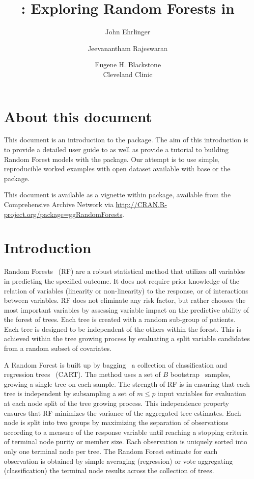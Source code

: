 \documentclass[nojss,letterpaper]{jss}\usepackage[]{graphicx}\usepackage[]{color}
\author{John Ehrlinger \and Jeevanantham Rajeswaran
\and Eugene H. Blackstone\\Cleveland Clinic}
\title{{\pkg{ggRandomForests}}: Exploring Random Forests in \proglang{R}}
\begin{document}



\section{About this document}
This document is an introduction to the   package. The aim of this introduction is to provide a detailed user guide to  as well as provide a tutorial to building Random Forest models with the  package. Our attempt is to use simple, reproducible worked examples with open dataset available with base  or the  package.

This document is available as a vignette within  package, available from the Comprehensive  Archive Network via \url{http://CRAN.R-project.org/package=ggRandomForests}.

\section{Introduction} \label{S:introduction}

Random Forests~\citep{Breiman:2001} (RF) are a robust statistical method that utilizes all variables in predicting the specified outcome. It does not require prior knowledge of the relation of variables (linearity or non-linearity) to the response, or of interactions between variables. RF does not eliminate any risk factor, but rather chooses the most important variables by assessing variable impact on the predictive ability of the forest of trees. Each tree is created with a random sub-group of patients. Each tree is designed to be independent of the others within the forest. This is achieved within the tree growing process by evaluating a split variable candidates from a random subset of covariates.

A Random Forest is built up by bagging~\citep{Breiman:1996} a collection of classification and regression trees~\citep{cart:1984} (CART). The method uses a set of $B$ bootstrap~\citep{bootstrap:1994} samples, growing a single tree on each sample. The strength of RF is in ensuring that each tree is independent by subsampling a set of $m \le p$ input variables for evaluation at each node split of the tree growing process. This independence property ensures that RF minimizes the variance of the aggregated tree estimates. Each node is split into two groups by maximizing the separation of observations according to a measure of the response variable until reaching a stopping criteria of terminal node purity or member size. Each observation is uniquely sorted into only one terminal node per tree. The Random Forest estimate for each observation is obtained by simple averaging (regression) or vote aggregating (classification) the terminal node results across the collection of trees. 
\end{document}
